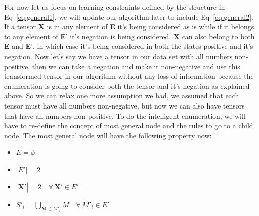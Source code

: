\documentclass{article}
\newcommand{\TX}{\textbf{X}\xspace}
\newcommand{\TZ}{\textbf{Z}\xspace}
\newcommand{\TM}{\textbf{M}\xspace}
\newcommand{\TE}{\textbf{E}\xspace}
\begin{document}
For now let us focus on learning constraints defined by the structure in Eq~\ref{eq:general1}, we will update our algorithm later to include Eq~\ref{eq:general2}.   
If a tensor \TX is in any element of \TE it's being considered as is while if it belongs to any element of \TE' it's negation is being considered. \TX can also belong to both \TE and \TE', in which case it's being considered in both the states positive and it's negation. 
Now let's say we have a tensor in our data set with all numbers non-positive, then we can take a negation and make it non-negative and use this transformed tensor in our algorithm without any loss of information because the enumeration is going to consider both the tensor and it's negation as explained above.
So we can relax one more assumption we had, we assumed that each tensor must have all numbers non-negative, but now we can also have tensors that have all numbers non-positive. To do the intelligent enumeration, we will have to re-define the concept of most general node and the rules to go to a child node.
The most general node will have the following property now:
\begin{itemize}
\item $E=\phi$
\item $|E'|=2$
\item $|\overline{\TX}'|=2 \quad \forall \, \overline{\TX}' \in E'$ 
\item $\displaystyle S'_i = \bigcup_{\TM \in \overline{M}'_i} M \quad \forall \, \overline{M}'_i \in E'$
\end{itemize}
\end{document}
